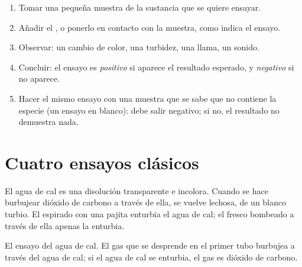 \begin{method}\label{met:g7:identifying-substances:run}
\begin{enumerate}
  \item Tomar una pequeña muestra de la sustancia que se quiere ensayar.
  \item Añadir el , o ponerlo en contacto con la muestra, como
        indica el ensayo.
  \item Observar: un cambio de color, una turbidez, una llama, un
        sonido.
  \item Concluir: el ensayo es \emph{positivo} si aparece el resultado
        esperado, y \emph{negativo} si no aparece.
  \item Hacer el mismo ensayo con una muestra que se sabe que no
        contiene la especie (un ensayo en blanco): debe salir negativo;
        si no, el resultado no demuestra nada.
\end{enumerate}
\end{method}

\section{Cuatro ensayos clásicos}

\begin{proposition}\label{prop:g7:identifying-substances:limewater}
El agua de cal es una disolución transparente e incolora. Cuando se hace
burbujear dióxido de carbono a través de ella, se vuelve lechosa, de un
blanco turbio. El  espirado con una pajita enturbia el agua de cal;
el  fresco bombeado a través de ella apenas la enturbia.
\end{proposition}

\begin{omfigure}

{\small El ensayo del agua de cal. El gas que se desprende en el primer
tubo burbujea a través del agua de cal; si el agua de cal se enturbia,
el gas es dióxido de carbono.}
\end{omfigure}

